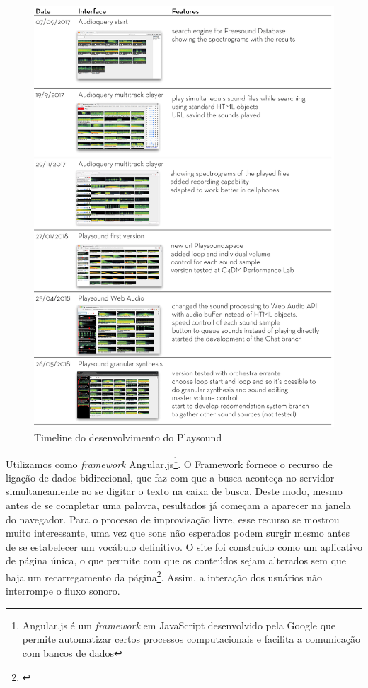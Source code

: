 \begin{figure}

\includegraphics[width=1\textwidth]{pictures/playsoundtimeline}
\caption{\label{pstimeline}Timeline do desenvolvimento do Playsound}
\label{fig:timeline}
\end{figure}

Utilizamos como \emph{framework} Angular.js\footnote{Angular.js é um \emph{framework} em JavaScript desenvolvido pela Google que permite automatizar certos processos computacionais e facilita a comunicação com bancos de dados}. O Framework fornece o recurso de ligação de dados bidirecional, que faz com que a busca aconteça no servidor simultaneamente ao se digitar o texto na caixa de busca. Deste modo, mesmo antes de se completar uma palavra, resultados já começam a aparecer na janela do navegador. Para o processo de improvisação livre, esse recurso se mostrou muito interessante, uma vez que sons não esperados podem surgir mesmo antes de se estabelecer um vocábulo definitivo. O site foi construído como um aplicativo de página única, o que permite com que os conteúdos sejam alterados sem que haja um recarregamento da página\footnote{\cite{Jadhav}}. Assim, a interação dos usuários não interrompe o fluxo sonoro.

